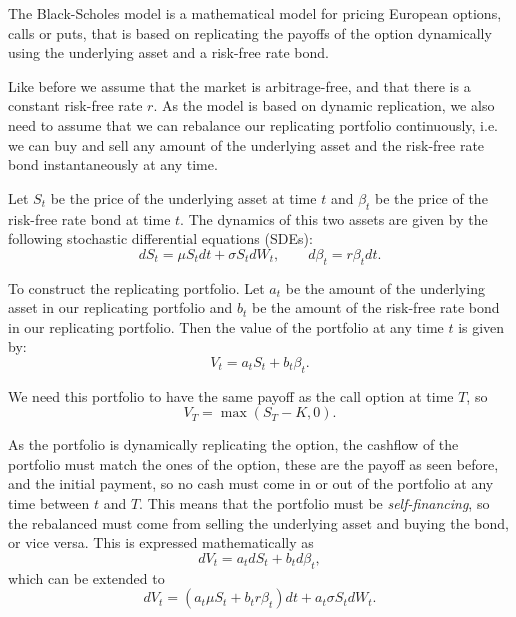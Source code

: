 The Black-Scholes model is a mathematical model for pricing European options, calls or puts,
that is based on replicating the payoffs of the option dynamically using the underlying asset and a risk-free rate bond.

Like before we assume that the market is arbitrage-free,
and that there is a constant risk-free rate $r$.
As the model is based on dynamic replication,
we also need to assume that we can rebalance our replicating portfolio continuously,
i.e. we can buy and sell any amount of the underlying asset and the risk-free rate bond instantaneously at any time.

Let $S_t$ be the price of the underlying asset at time $t$ and $\beta_t$ be the price of the risk-free rate bond at time $t$.
The dynamics of this two assets are given by the following stochastic differential equations (SDEs):
\begin{equation*}
    dS_t = \mu S_t dt + \sigma S_t dW_t,
    \qquad
    d\beta_t = r \beta_t dt.
\end{equation*}

To construct the replicating portfolio.
Let $a_t$ be the amount of the underlying asset in our replicating portfolio and $b_t$ be the amount of the risk-free rate bond in our replicating portfolio.
Then the value of the portfolio at any time $t$ is given by:
\begin{equation*}
    V_t = a_t S_t + b_t \beta_t.
\end{equation*}

We need this portfolio to have the same payoff as the call option at time $T$, so
\begin{equation*}
    V_T = \max(S_T - K, 0).
\end{equation*}

As the portfolio is dynamically replicating the option,
the cashflow of the portfolio must match the ones of the option,
these are the payoff as seen before, and the initial payment,
so no cash must come in or out of the portfolio at any time between $t$ and $T$.
This means that the portfolio must be \textit{self-financing},
so the rebalanced must come from selling the underlying asset and buying the bond, or vice versa.
This is expressed mathematically as
\begin{equation}\label{eq:self_financing}
    dV_t = a_t dS_t + b_t d\beta_t,
\end{equation}
which can be extended to
\begin{equation*}
    dV_t = \left( a_t \mu S_t + b_t r \beta_t \right) dt + a_t \sigma S_t dW_t.
\end{equation*}

